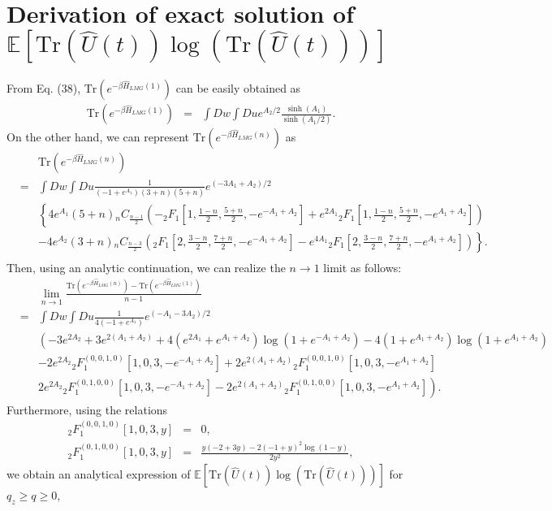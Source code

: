 \documentclass[
aps,
pre,
showpacs
]{revtex4-1}
\newcommand{\be}{\begin{eqnarray}}
\newcommand{\ee}{\end{eqnarray}}
\newcommand{\no}{\nonumber}
\newcommand{\Tr}{\mbox{Tr} }
\begin{document}
\section{Derivation of exact solution of $\mathbb{E} \left[ \Tr \left(\hat{U}(t)\right)\log\left( \Tr \left(\hat{U}(t)\right) \right) \right]$ } 
From Eq. (38), $\Tr\left( e^{-\beta\hat{H}_{LMG}(1)  }\right)  $ can be easily obtained as
\be
\Tr\left( e^{-\beta\hat{H}_{LMG}(1)  }\right)
&=& \int Dw \int Du   e^{A_2/2}\frac{\sinh(A_1 )}{\sinh(A_1/2)} .
\ee
On the other hand, we can represent $\Tr\left( e^{-\beta\hat{H}_{LMG}(n)  }\right)$ as
\be
&&\Tr\left( e^{-\beta\hat{H}_{LMG}(n)  }\right)
\no\\
&=& \int Dw \int Du \frac{1}{(-1+e^{A_1})(3+n)(5+n)}e^{(-3A_1+A_2)/2} 
\no\\
&&\left\{  4 e^{A_1}(5+n) {}_n C_{\frac{n-1}{2}} \left( -{}_2 F_{1} \left[1,\frac{1-n}{2},\frac{5+n}{2}, -e^{-A_1+A_2}\right]  +e^{2A_1}  {}_2 F_{1} \left[1,\frac{1-n}{2},\frac{5+n}{2}, -e^{A_1+A_2}\right]  \right) \right.
\no\\
&& \left.  -4e^{A_2} (3+n) {}_n C_{\frac{n-3}{2}} \left({}_2 F_{1}\left[2,\frac{3-n}{2},\frac{7+n}{2}, -e^{-A_1+A_2}\right]  - e^{4A_1}{}_2 F_{1} \left[2,\frac{3-n}{2},\frac{7+n}{2}, -e^{A_1+A_2}\right]  \right) \right\}.
\no\\
\ee
Then, using an analytic continuation, we can realize the $n\rightarrow 1$ limit as follows:
\be
&&\lim_{n\rightarrow1}    \frac{ \Tr\left( e^{-\beta\hat{H}_{LMG}(n)  }\right)- \Tr\left( e^{-\beta\hat{H}_{LMG}(1)  }\right)  }{n-1} 
\no\\
&=&\int Dw \int Du\frac{1}{4(-1+e^{A_1})}e^{(-A_1-3A_2)/2}
\no\\
&&   \left( -3 e^{2A_2}+3 e^{2(A_1+A_2)} +4(e^{2A_1}+e^{A_1 +A_2})\log(1+e^{-A_1+A_2}) -4(1+e^{A_1+A_2})\log(1+e^{A_1+A_2}) \right.
\no\\
&&\left. -2e^{2A_2}   {}_2 F_{1}^{(0,0,1,0)} \left[1,0,3, -e^{-A_1+A_2}\right] +2e^{2(A_1+A_2)}   {}_2 F_{1}^{(0,0,1,0)} \left[1,0,3, -e^{A_1+A_2}\right] \right.
\no\\
&& \left. 2e^{2A_2}   {}_2 F_{1}^{(0,1,0,0)} \left[1,0,3, -e^{-A_1+A_2}\right] -2e^{2(A_1+A_2)}   {}_2 F_{1}^{(0,1,0,0)} \left[1,0,3, -e^{A_1+A_2}\right] \right) .
\ee 
Furthermore, using the relations
\be
{}_2 F_{1}^{(0,0,1,0)} \left[1,0,3, y\right] &=&0,
\\
{}_2 F_{1}^{(0,1,0,0)} \left[1,0,3, y \right] &=&\frac{y(-2+3y)-2(-1+y)^2\log(1-y)}{2y^2},
\ee
we obtain an analytical expression of $\mathbb{E} \left[ \Tr \left(\hat{U}(t)\right)\log\left( \Tr \left(\hat{U}(t)\right) \right) \right]$ for $q_z\ge q \ge 0$,
\end{document}
